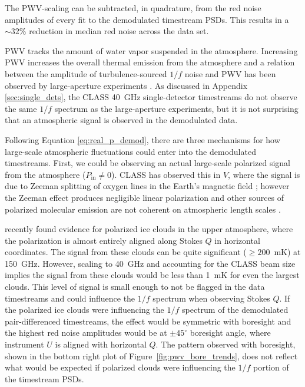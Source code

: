 \documentclass[twocolumn, tighten, numberedappendix, twocolappendix]{aastex63}
\begin{document}
\noindent The PWV-scaling can be subtracted, in quadrature, from the red noise amplitudes of every fit to the demodulated timestream PSDs. This results in a $\sim32\%$ reduction in median red noise across the data set. 


PWV tracks the amount of water vapor suspended in the atmosphere. Increasing PWV increases the overall thermal emission from the atmosphere and a relation between the amplitude of turbulence-sourced $1/f$ noise and PWV has been observed by large-aperture experiments \citep{LayHalverson2000, Dunner2013}. As discussed in Appendix \ref{sec:single_dets}, the CLASS 40~GHz single-detector timestreams do not observe the same $1/f$ spectrum as the large-aperture experiments, but it is not surprising that an atmospheric signal is observed in the demodulated data.

Following Equation \ref{eq:real_p_demod}, there are three mechanisms for how large-scale atmospheric fluctuations could enter into the demodulated timestreams. First, we could be observing an actual large-scale polarized signal from the atmosphere ($P_\mathrm{in} \neq 0$). CLASS has observed this in $V$, where the signal is due to Zeeman splitting of oxygen lines in the Earth's magnetic field \citep{petr20}; however the Zeeman effect produces negligible linear polarization and other sources of polarized molecular emission are not coherent on atmospheric length scales \citep{Hanany2003}.

\cite{Takakura2019} recently found evidence for polarized ice clouds in the upper atmosphere, where the polarization is almost entirely aligned along Stokes $Q$ in horizontal coordinates. The signal from these clouds can be quite significant ($\geq 200$~mK) at 150~GHz. However, scaling to 40~GHz and accounting for the CLASS beam size implies the signal from these clouds would be less than 1~mK for even the largest clouds. This level of signal is small enough to not be flagged in the data timestreams and could influence the $1/f$ spectrum when observing Stokes $Q$. If the polarized ice clouds were influencing the $1/f$ spectrum of the demodulated pair-differenced timestreams, the effect would be symmetric with boresight and the highest red noise amplitudes would be at $\pm45^\circ$ boresight angle, where instrument $U$ is aligned with horizontal $Q$. The pattern observed with boresight, shown in the bottom right plot of Figure~\ref{fig:pwv_bore_trends}, does not reflect what would be expected if polarized clouds were influencing the $1/f$ portion of the timestream PSDs.
\end{document}
